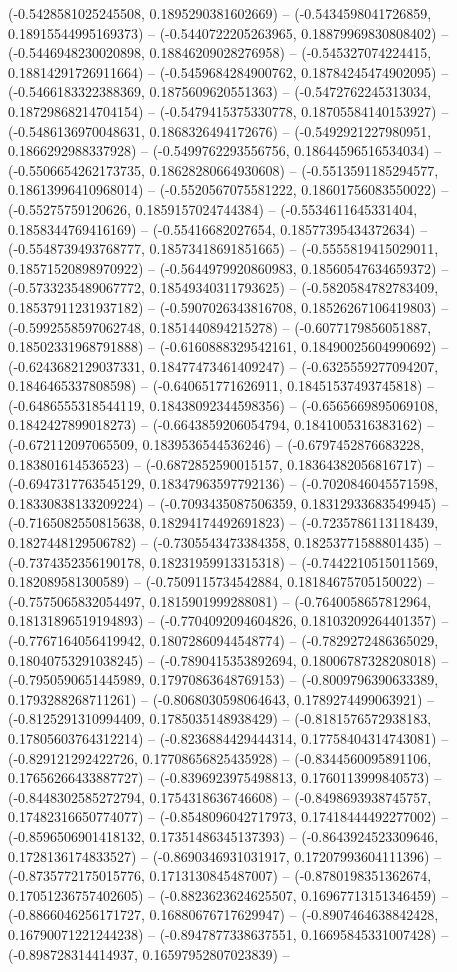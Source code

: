 (-0.5428581025245508, 0.1895290381602669) -- (-0.5434598041726859, 0.18915544995169373) -- (-0.5440722205263965, 0.18879969830808402) -- (-0.5446948230020898, 0.18846209028276958) -- (-0.545327074224415, 0.18814291726911664) -- (-0.5459684284900762, 0.18784245474902095) -- (-0.5466183322388369, 0.1875609620551363) -- (-0.5472762245313034, 0.18729868214704154) -- (-0.5479415375330778, 0.18705584140153927) -- (-0.5486136970048631, 0.1868326494172676) -- (-0.5492921227980951, 0.1866292988337928) -- (-0.5499762293556756, 0.18644596516534034) -- (-0.5506654262173735, 0.18628280664930608) -- (-0.5513591185294577, 0.18613996410968014) -- (-0.5520567075581222, 0.18601756083550022) -- (-0.55275759120626, 0.1859157024744384) -- (-0.5534611645331404, 0.1858344769416169) -- (-0.55416682027654, 0.18577395434372634) -- (-0.5548739493768777, 0.18573418691851665) -- (-0.5555819415029011, 0.18571520898970922) -- (-0.5644979920860983, 0.18560547634659372) -- (-0.5733235489067772, 0.18549340311793625) -- (-0.5820584782783409, 0.18537911231937182) -- (-0.5907026343816708, 0.18526267106419803) -- (-0.5992558597062748, 0.1851440894215278) -- (-0.6077179856051887, 0.18502331968791888) -- (-0.6160888329542161, 0.18490025604990692) -- (-0.6243682129037331, 0.18477473461409247) -- (-0.6325559277094207, 0.1846465337808598) -- (-0.640651771626911, 0.18451537493745818) -- (-0.6486555318544119, 0.18438092344598356) -- (-0.6565669895069108, 0.1842427899018273) -- (-0.6643859206054794, 0.1841005316383162) -- (-0.672112097065509, 0.1839536544536246) -- (-0.6797452876683228, 0.183801614536523) -- (-0.6872852590015157, 0.18364382056816717) -- (-0.6947317763545129, 0.18347963597792136) -- (-0.7020846045571598, 0.18330838133209224) -- (-0.7093435087506359, 0.18312933683549945) -- (-0.7165082550815638, 0.18294174492691823) -- (-0.7235786113118439, 0.1827448129506782) -- (-0.7305543473384358, 0.18253771588801435) -- (-0.7374352356190178, 0.18231959913315318) -- (-0.7442210515011569, 0.182089581300589) -- (-0.7509115734542884, 0.18184675705150022) -- (-0.7575065832054497, 0.1815901999288081) -- (-0.7640058657812964, 0.18131896519194893) -- (-0.7704092094604826, 0.18103209264401357) -- (-0.7767164056419942, 0.18072860944548774) -- (-0.7829272486365029, 0.18040753291038245) -- (-0.7890415353892694, 0.18006787328208018) -- (-0.7950590651445989, 0.17970863648769153) -- (-0.8009796390633389, 0.1793288268711261) -- (-0.8068030598064643, 0.1789274499063921) -- (-0.8125291310994409, 0.1785035148938429) -- (-0.8181576572938183, 0.17805603764312214) -- (-0.8236884429444314, 0.17758404314743081) -- (-0.829121292422726, 0.17708656825435928) -- (-0.8344560095891106, 0.17656266433887727) -- (-0.8396923975498813, 0.1760113999840573) -- (-0.8448302585272794, 0.1754318636746608) -- (-0.8498693938745757, 0.17482316650774077) -- (-0.8548096042717973, 0.17418444492277002) -- (-0.8596506901418132, 0.17351486345137393) -- (-0.8643924523309646, 0.1728136174833527) -- (-0.8690346931031917, 0.17207993604111396) -- (-0.8735772175015776, 0.1713130845487007) -- (-0.8780198351362674, 0.17051236757402605) -- (-0.8823623624625507, 0.16967713151346459) -- (-0.8866046256171727, 0.16880676717629947) -- (-0.8907464638842428, 0.16790071221244238) -- (-0.8947877338637551, 0.16695845331007428) -- (-0.898728314414937, 0.16597952807023839) -- 